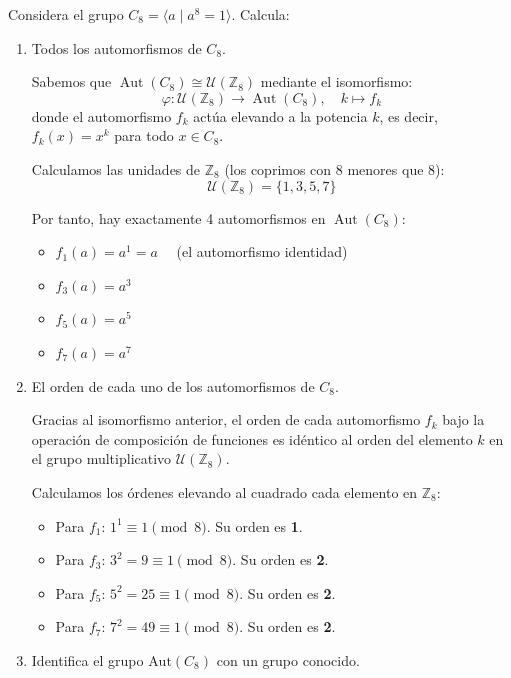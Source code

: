 \documentclass[12pt]{article}
\begin{document}
    \begin{ejercicio}[1 punto]
        Considera el grupo $C_8 = \langle a \mid a^8 = 1 \rangle$. Calcula:
        \begin{enumerate}
            \item Todos los automorfismos de $C_8$.
            
            Sabemos que $\operatorname{Aut}(C_8) \cong \mathcal{U}(\mathbb{Z}_8)$ mediante el isomorfismo:
            \[ \varphi: \mathcal{U}(\mathbb{Z}_8) \to \operatorname{Aut}(C_8), \quad k \mapsto f_k \]
            donde el automorfismo $f_k$ actúa elevando a la potencia $k$, es decir, $f_k(x) = x^k$ para todo $x \in C_8$.
            
            Calculamos las unidades de $\mathbb{Z}_8$ (los coprimos con 8 menores que 8): 
            $$\mathcal{U}(\mathbb{Z}_8) = \{1, 3, 5, 7\}$$
            
            Por tanto, hay exactamente 4 automorfismos en $\operatorname{Aut}(C_8)$:
            \begin{itemize}
                \item $f_1(a) = a^1 = a \quad$ (el automorfismo identidad)
                \item $f_3(a) = a^3$
                \item $f_5(a) = a^5$
                \item $f_7(a) = a^7$
            \end{itemize}


            \item El orden de cada uno de los automorfismos de $C_8$.
            
            Gracias al isomorfismo anterior, el orden de cada automorfismo $f_k$ bajo la operación de composición de funciones es idéntico al orden del elemento $k$ en el grupo multiplicativo $\mathcal{U}(\mathbb{Z}_8)$.
        
            Calculamos los órdenes elevando al cuadrado cada elemento en $\mathbb{Z}_8$:
            \begin{itemize}
                \item Para $f_1$: $1^1 \equiv 1 \pmod 8$. Su orden es \textbf{1}.
                \item Para $f_3$: $3^2 = 9 \equiv 1 \pmod 8$. Su orden es \textbf{2}.
                \item Para $f_5$: $5^2 = 25 \equiv 1 \pmod 8$. Su orden es \textbf{2}.
                \item Para $f_7$: $7^2 = 49 \equiv 1 \pmod 8$. Su orden es \textbf{2}.
            \end{itemize}
            \item Identifica el grupo $\text{Aut}(C_8)$ con un grupo conocido.
            

\end{enumerate}
\end{ejercicio}
\end{document}
